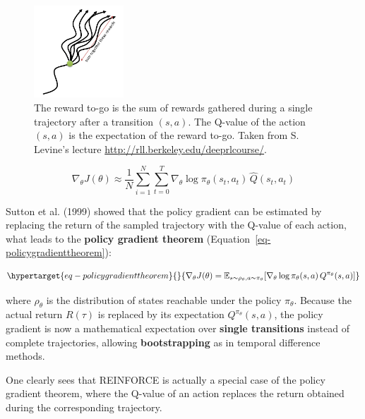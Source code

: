 \documentclass[
  letterpaper,
  DIV=11,
  numbers=noendperiod]{scrreprt}
\begin{document}
\begin{figure}

{\centering \includegraphics[width=0.3\textwidth,height=\textheight]{./img/rewardtogo.png}

}

\caption{\label{fig-rewardtogo}The reward to-go is the sum of rewards
gathered during a single trajectory after a transition \((s, a)\). The
Q-value of the action \((s, a)\) is the expectation of the reward to-go.
Taken from S. Levine's lecture
\url{http://rll.berkeley.edu/deeprlcourse/}.}

\end{figure}

\[
 \nabla_\theta J(\theta) \approx \frac{1}{N} \sum_{i=1}^N \sum_{t=0}^T \nabla_\theta \log \pi_\theta(s_t, a_t) \, \hat{Q}(s_t, a_t)
\]

Sutton et al. (1999) showed that the policy gradient can be estimated by
replacing the return of the sampled trajectory with the Q-value of each
action, what leads to the \textbf{policy gradient theorem}
(Equation~\ref{eq-policygradienttheorem}):

\begin{equation}\protect\hypertarget{eq-policygradienttheorem}{}{
    \nabla_\theta J(\theta) =  \mathbb{E}_{s \sim \rho_\theta, a \sim \pi_\theta}[\nabla_\theta \log \pi_\theta(s, a) \, Q^{\pi_\theta}(s, a)]
}\label{eq-policygradienttheorem}\end{equation}

where \(\rho_\theta\) is the distribution of states reachable under the
policy \(\pi_\theta\). Because the actual return \(R(\tau)\) is replaced
by its expectation \(Q^{\pi_\theta}(s, a)\), the policy gradient is now
a mathematical expectation over \textbf{single transitions} instead of
complete trajectories, allowing \textbf{bootstrapping} as in temporal
difference methods.

One clearly sees that REINFORCE is actually a special case of the policy
gradient theorem, where the Q-value of an action replaces the return
obtained during the corresponding trajectory.
\end{document}

